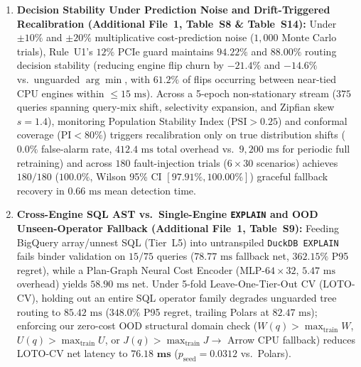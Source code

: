\documentclass[10pt,a4paper]{article}
\begin{document}
\begin{enumerate}[leftmargin=1.5em,itemsep=0.8pt]
latency reduction of $m=15$ calibration on 22-thread Node~2 ($48.92\text{ ms}$), achieves $\mathbf{93.33\%}$ Top-1 ($30.12\text{ ms}$ net vs.\ $29.44\text{ ms}$ full LOGO) on Apple M1 Node~3, and reaches $\mathbf{100.0\%}$ Top-1 ($23.02\text{ ms}$ at $\text{SF}=1\text{ GB}$ and $461.71\text{ ms}$ at $\text{SF}=10\text{ GB}$) on Cloud-Hosted Server Tesla~T4 Node~4, while sweeping GPU VRAM caps across $M_{\text{gpu\_max}} \in \{1.28\text{ GB}, 4.00\text{ GB}, 8.00\text{ GB}, 15.0/16.0\text{ GB}\}$ at $\text{SF}=10\text{ GB}$ smoothly reduces required PCIe streaming chunks from $12\rightarrow 4\rightarrow 2\rightarrow \mathbf{1}$ with $\mathbf{0.0\%}$ OOM events.
    \item \textbf{Decision Stability Under Prediction Noise and Drift-Triggered Recalibration (Additional File~1, Table~S8 \& Table~S14):} Under $\pm 10\%$ and $\pm 20\%$ multiplicative cost-prediction noise ($1{,}000$ Monte Carlo trials), Rule~U1's $12\%$ PCIe guard maintains $94.22\%$ and $88.00\%$ routing decision stability (reducing engine flip churn by $-21.4\%$ and $-14.6\%$ vs.\ unguarded $\arg\min$, with $61.2\%$ of flips occurring between near-tied CPU engines within $\le 15\text{ ms}$). Across a 5-epoch non-stationary stream ($375$ queries spanning query-mix shift, selectivity expansion, and Zipfian skew $s=1.4$), monitoring Population Stability Index ($\text{PSI}>0.25$) and conformal coverage ($\text{PI}<80\%$) triggers recalibration only on true distribution shifts ($0.0\%$ false-alarm rate, $412.4\text{ ms}$ total overhead vs.\ $9{,}200\text{ ms}$ for periodic full retraining) and across $180$ fault-injection trials ($6\times 30$ scenarios) achieves $180/180$ ($100.0\%$, Wilson 95\% CI $[97.91\%, 100.00\%]$) graceful fallback recovery in $0.66\text{ ms}$ mean detection time.
    \item \textbf{Cross-Engine SQL AST vs.\ Single-Engine \texttt{EXPLAIN} and OOD Unseen-Operator Fallback (Additional File~1, Table~S9):} Feeding BigQuery array/unnest SQL (Tier~L5) into untranspiled \texttt{DuckDB EXPLAIN} fails binder validation on $15/75$ queries ($78.77\text{ ms}$ fallback net, $362.15\%$ P95 regret), while a Plan-Graph Neural Cost Encoder (MLP-$64\times 32$, $5.47\text{ ms}$ overhead) yields $58.90\text{ ms}$ net. Under 5-fold Leave-One-Tier-Out CV (LOTO-CV), holding out an entire SQL operator family degrades unguarded tree routing to $85.42\text{ ms}$ ($348.0\%$ P95 regret, trailing Polars at $82.47\text{ ms}$); enforcing our zero-cost OOD structural domain check ($W(q)>\max_{\text{train}}W$, $U(q)>\max_{\text{train}}U$, or $J(q)>\max_{\text{train}}J \rightarrow$ Arrow CPU fallback) reduces LOTO-CV net latency to $\mathbf{76.18\text{ ms}}$ ($p_{\text{seed}}=0.0312$ vs.\ Polars).
\end{enumerate}
\end{document}
